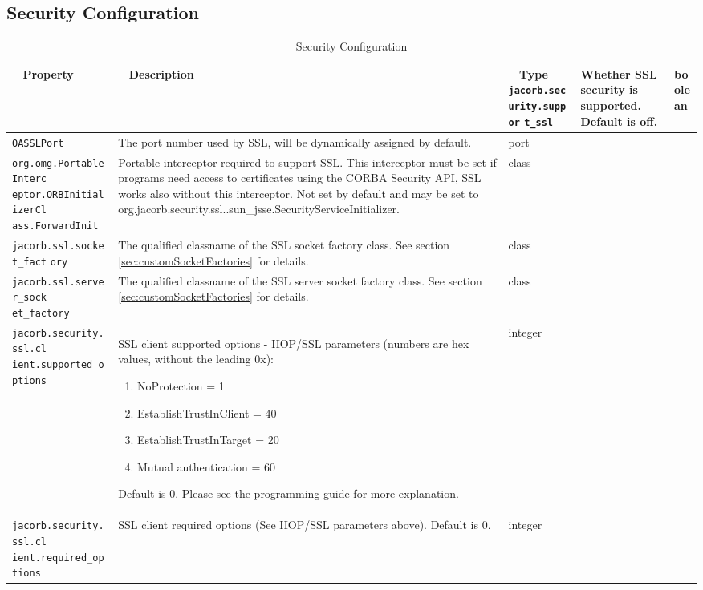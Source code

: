 \subsection{Security Configuration}
\begin{small}
\begin{longtable}{|p{5cm}|p{9cm}|p{2cm}|}
\caption{Security Configuration}\\
\hline
~ \hfill \textbf {Property} \hfill ~ & ~ \hfill \textbf {Description} \hfill ~ & ~ \hfill \textbf {Type} \hfill ~ \endhead
\hline
\verb"jacorb.security.suppor"
\verb"t_ssl" & Whether SSL security is supported. Default is off. & boolean \\
\hline
\verb"OASSLPort" & The port number used by SSL, will be dynamically assigned by default. & port \\
\hline
\verb"org.omg.PortableInterc"
\verb"eptor.ORBInitializerCl"
\verb"ass.ForwardInit" & Portable interceptor required to support SSL. This interceptor must be set if programs need access to certificates using the CORBA Security API, SSL works also without this interceptor. Not set by default and may be set to org.jacorb.security.ssl..sun\_jsse.SecurityServiceInitializer. & class \\
\hline
\verb"jacorb.ssl.socket_fact"
\verb"ory" & The qualified classname of the SSL socket factory class. See section \ref{sec:customSocketFactories} for details.& class \\
\hline
\verb"jacorb.ssl.server_sock"
\verb"et_factory" & The qualified classname of the SSL server socket factory class. See section \ref{sec:customSocketFactories} for details.& class \\
\hline
\verb"jacorb.security.ssl.cl"
\verb"ient.supported_options" & SSL client supported options - IIOP/SSL parameters (numbers are hex values, without the leading 0x):
\begin{enumerate}
\item NoProtection = 1
\item EstablishTrustInClient = 40
\item EstablishTrustInTarget = 20
\item Mutual authentication = 60
\end{enumerate}
Default is 0. Please see the programming guide for more explanation. & integer \\
\hline
\verb"jacorb.security.ssl.cl"
\verb"ient.required_options" & SSL client required options (See IIOP/SSL parameters above). Default is 0. & integer \\
\hline

\end{longtable}
\end{small}
